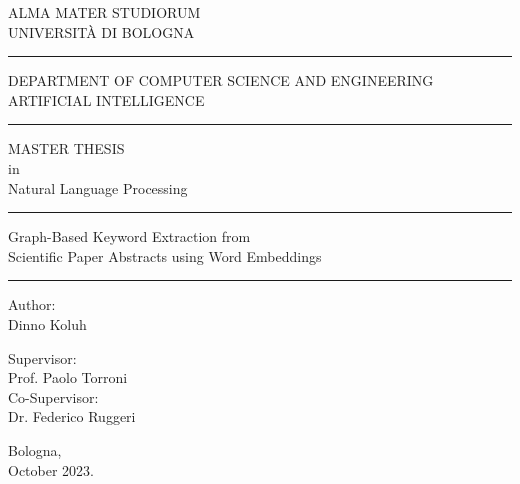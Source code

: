 \documentclass[12pt]{article}
\numberwithin{equation}{section}
\begin{document}
	
	\begin{titlepage}
		\begin{center}
			
			{\Large ALMA MATER STUDIORUM \\ UNIVERSIT\`A  DI BOLOGNA \\}
			\vspace{0.4cm} 
			\hrule
			\vspace{0.4cm} 
			{\Large DEPARTMENT OF COMPUTER SCIENCE AND ENGINEERING \\} 
			{\Large ARTIFICIAL INTELLIGENCE \\}
			\vspace{0.4cm} 
			\hrule
			\vspace{1cm}
			{\Large MASTER THESIS}\\[0.4cm]
			{\large in} \\[0.4cm]
			{\Large Natural Language Processing}\\[1cm]
			
			\hrule
			\vspace{0.4cm}
			
			{\Huge Graph-Based Keyword Extraction from}\\[0.3cm]
			{\Huge Scientific Paper Abstracts using Word Embeddings}
			\vspace{0.4cm}
			
			\hrule
			\vspace{2cm}
			
			{\large Author:}\\
			{\large Dinno Koluh\\}
			
			\vspace{2cm}
			
			{\large Supervisor:}\\[0.1cm]
			{\large Prof. Paolo Torroni}\\[0.4cm]
			
			{\large Co-Supervisor:}\\[0.1cm]
			{\large Dr. Federico Ruggeri}
			
			\vspace{2cm} 
			{\large Bologna,}\\[0.1cm] 
			{\large October 2023.}
			
		\end{center}
	\end{titlepage}
	\newpage
	\thispagestyle{empty}
	
\end{document}
